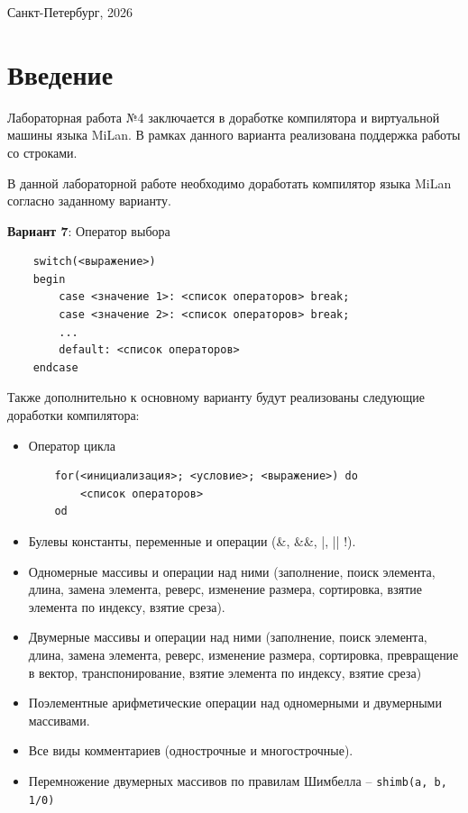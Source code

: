 \documentclass[a4paper,final]{article}
\begin{document}
\hfill \break
\begin{center} \small{Санкт-Петербург, 2026} \end{center}


\newpage
\tableofcontents
\newpage


\section*{Введение}
Лабораторная работа №4 заключается в доработке компилятора и виртуальной машины языка MiLan. В рамках данного варианта реализована поддержка работы со строками.

В данной лабораторной работе необходимо доработать компилятор языка MiLan согласно заданному варианту.

\textbf{Вариант 7}: Оператор выбора
\begin{verbatim}
    switch(<выражение>)
    begin
        case <значение 1>: <список операторов> break;
        case <значение 2>: <список операторов> break;
        ...
        default: <список операторов>
    endcase
\end{verbatim}

Также дополнительно к основному варианту будут реализованы следующие доработки компилятора:
\begin{itemize}
    \item Оператор цикла
\begin{verbatim}
    for(<инициализация>; <условие>; <выражение>) do
        <список операторов>
    od
\end{verbatim}
    \item Булевы константы, переменные и операции (\&, \&\&, |, || !).
    \item Одномерные массивы и операции над ними (заполнение, поиск элемента, длина, замена элемента, реверс, изменение размера, сортировка, взятие элемента по индексу, взятие среза).
    \item Двумерные массивы и операции над ними (заполнение, поиск элемента, длина, замена элемента, реверс, изменение размера, сортировка, превращение в вектор, транспонирование, взятие элемента по индексу, взятие среза)
    \item Поэлементные арифметические операции над одномерными и двумерными массивами.
    \item Все виды комментариев (однострочные и многострочные).
    \item Перемножение двумерных массивов по правилам Шимбелла -- \texttt{shimb(a, b, 1/0)}
\end{itemize}
\end{document}
